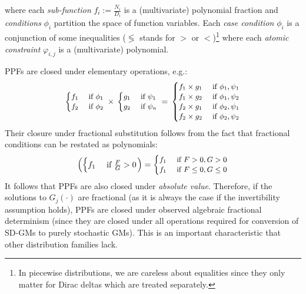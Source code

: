 \documentclass{article}
\newcommand{\bvec}[1]{\textbf{#1}}
\newcommand{\case}[2]{#2 &\text{ if } #1}%
\begin{document}
where each \emph{sub-function} $f_i := \frac{N_i}{D_i}$ is a (multivariate) polynomial fraction and
\emph{conditions} $\phi_i$ partition the space of function variables. 
Each \emph{case condition} $\phi_i$ is a conjunction of some inequalities ($\lessgtr$ stands for  
$>$ or $<$)\footnote{In piecewise distributions,  
we are careless about equalities since they only matter for Dirac deltas which are treated separately.
} 
where each \emph{atomic constraint} $\varphi_{i,j}$ is a (multivariate) polynomial.


PPFs are closed under elementary operations, e.g.:
\begin{equation*}
\footnotesize
  \begin{cases}
  \case{\phi_1}{f_1}\\
  \case{\phi_2}{f_2}    
  \end{cases}
\,
 \times
\,
  \begin{cases}
  \case{\psi_1}{g_1} \\
  \case{\psi_n}{g_2} 
  \end{cases}
 \, = \,
\begin{cases}
  \case{\phi_1, \psi_1}{f_1 \times g_1} \\ 
  \case{\phi_1, \psi_2}{f_1 \times g_2} \\
  \case{\phi_2, \psi_1}{f_2 \times g_1} \\
  \case{\phi_2, \psi_2}{f_2 \times g_2}
  \end{cases}
\end{equation*} 
Their closure under fractional substitution follows from the fact that 
fractional conditions can be restated as polynomials:
\begin{align*}
\left(
 \begin{cases}
  \case{\frac{F}{G} > 0}{f_1} \\ 
 \end{cases} 
\right)
 =
{\footnotesize
\begin{cases}
  \case{F > 0, G > 0 }{f_1} \\ 
  \case{F \leq 0, G \leq 0}{f_1} \\ 
 \end{cases} 
}
\end{align*}
It follows that PPFs are also closed under \emph{absolute value}.
Therefore, if the solutions to $G_j(\cdot)$ are fractional (as it is always the case if the invertibility assumption holds),
PPFs are closed under  observed algebraic fractional determinism 
(since they are closed under  
all operations required for conversion of SD-GMs to purely stochastic GMs).
This is an important characteristic that other distribution families lack.  
\end{document}
